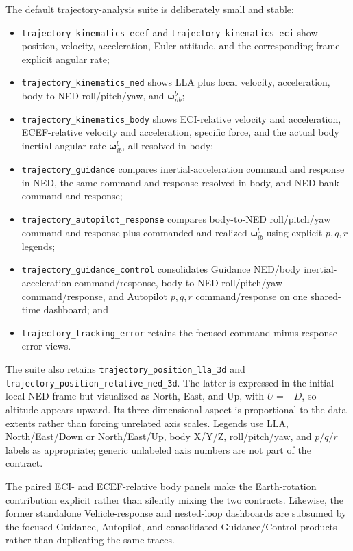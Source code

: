 The default trajectory-analysis suite is deliberately small and stable:
\begin{itemize}
    \item \texttt{trajectory\_kinematics\_ecef} and
          \texttt{trajectory\_kinematics\_eci} show position, velocity,
          acceleration, Euler attitude, and the corresponding frame-explicit
          angular rate;
    \item \texttt{trajectory\_kinematics\_ned} shows LLA plus local velocity,
          acceleration, body-to-NED roll/pitch/yaw, and
          $\boldsymbol{\omega}_{nb}^{b}$;
    \item \texttt{trajectory\_kinematics\_body} shows ECI-relative velocity
          and acceleration, ECEF-relative velocity and acceleration, specific
          force, and the actual body inertial angular rate
          $\boldsymbol{\omega}_{ib}^{b}$, all resolved in body;
    \item \texttt{trajectory\_guidance} compares inertial-acceleration
          command and response in NED, the same command and response resolved
          in body, and NED bank command and response;
    \item \texttt{trajectory\_autopilot\_response} compares body-to-NED
          roll/pitch/yaw command and response plus commanded and realized
          $\boldsymbol{\omega}_{ib}^{b}$ using explicit \(p,q,r\) legends;
    \item \texttt{trajectory\_guidance\_control} consolidates Guidance NED/body
          inertial-acceleration command/response, body-to-NED
          roll/pitch/yaw command/response, and Autopilot \(p,q,r\)
          command/response on one shared-time dashboard; and
    \item \texttt{trajectory\_tracking\_error} retains the focused
          command-minus-response error views.
\end{itemize}

The suite also retains \texttt{trajectory\_position\_lla\_3d} and
\texttt{trajectory\_position\_relative\_ned\_3d}. The latter is expressed in
the initial local NED frame but visualized as North, East, and Up, with
\(U=-D\), so altitude appears upward. Its three-dimensional aspect is
proportional to the data extents rather than forcing unrelated axis scales.
Legends use LLA, North/East/Down or North/East/Up, body X/Y/Z,
roll/pitch/yaw, and \(p/q/r\) labels as appropriate; generic unlabeled axis
numbers are not part of the contract.

The paired ECI- and ECEF-relative body panels make the Earth-rotation
contribution explicit rather than silently mixing the two contracts.
Likewise, the former standalone Vehicle-response and nested-loop dashboards
are subsumed by the focused Guidance, Autopilot, and consolidated
Guidance/Control products rather than duplicating the same traces.


